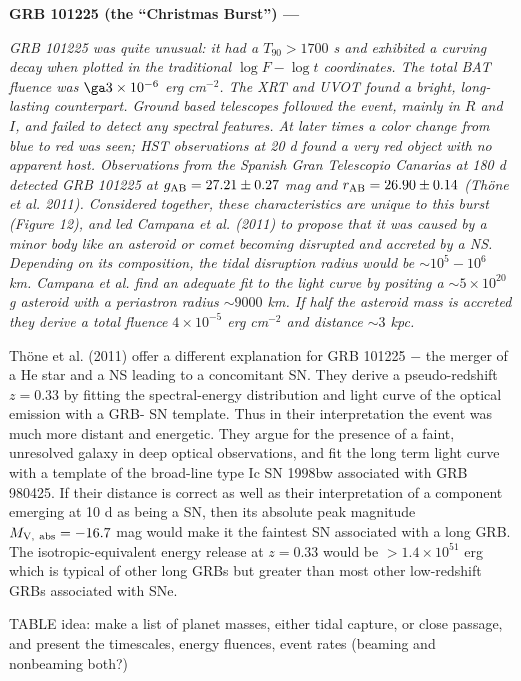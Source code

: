 {\bf GRB 101225 (the ``Christmas Burst'') ---} {\it GRB 101225 was quite
unusual: it had a $T_{90} > 1700$ s and exhibited a curving decay
when plotted in the traditional $\log F - \log t$ coordinates.  The
total BAT fluence was $\ga3\times 10^{-6}$ erg cm$^{-2}$.  The XRT
and UVOT found a bright, long-lasting counterpart.  Ground based
telescopes followed the event, mainly in $R$ and $I$, and failed to
detect any spectral features.  At later times a color change from
blue to red was seen; \emph{HST} observations at 20 d found a very
red object with no apparent host.  Observations from the Spanish
Gran Telescopio Canarias at 180 d detected GRB 101225 at $g_{\rm
AB}= 27.21\pm0.27$ mag and $r_{\rm AB}= 26.90\pm0.14$ (Th\"one et
al. 2011).  Considered together, these characteristics are unique to
this burst (Figure 12), and led Campana et al. (2011) to propose
that it was caused by a minor body like an asteroid or comet
becoming disrupted and accreted by a NS.  Depending on its
composition, the tidal disruption radius would be $\sim10^5 - 10^6$
km.  Campana et al. find an adequate fit to the light curve by
positing a $\sim 5\times 10^{20}$ g asteroid with a periastron
radius $\sim9000$ km.  If half the asteroid mass is accreted they
derive a total fluence $4\times 10^{-5}$ erg cm$^{-2}$ and distance
$\sim3$ kpc.


Th\"one et al. (2011) offer a different explanation for GRB 101225
$-$ the merger of a He star and a NS leading to a concomitant SN.
They derive a pseudo-redshift $z=0.33$ by fitting the
spectral-energy distribution and light curve of the optical emission
with a GRB- SN template.  Thus in their interpretation the event was
much more distant and energetic.  They argue for the presence of a
faint, unresolved galaxy in deep optical observations, and fit the
long term light curve with a template of the broad-line type Ic SN
1998bw associated with GRB 980425.  If their distance is correct as
well as their interpretation of a component emerging at 10 d as
being a SN, then its absolute peak magnitude $M_{\rm V, \ abs} =
-16.7$ mag would make it the faintest SN associated with a long GRB.
The isotropic-equivalent energy release at $z=0.33$ would be
$>1.4\times 10^{51}$ erg which is typical of other long GRBs but
greater than most other low-redshift GRBs associated with SNe.  }


TABLE idea:
make a list of planet masses, either tidal capture, or close passage, and present the timescales, energy fluences, event rates (beaming and 
nonbeaming both?)
